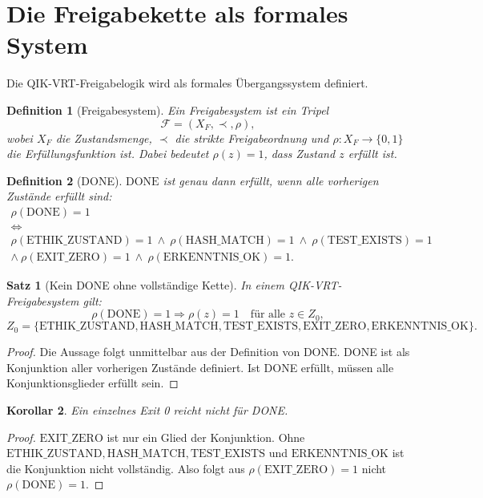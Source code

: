 \documentclass[11pt,a4paper,oneside]{scrartcl}
\theoremstyle{qikstyle}
\newtheorem{definition}{Definition}[section]
\newtheorem{satz}{Satz}[section]
\newtheorem{korollar}[satz]{Korollar}
\newcommand{\DONE}{\mathrm{DONE}}
\newcommand{\HASH}{\mathrm{HASH\_MATCH}}
\newcommand{\TEST}{\mathrm{TEST\_EXISTS}}
\newcommand{\EXIT}{\mathrm{EXIT\_ZERO}}
\newcommand{\ERK}{\mathrm{ERKENNTNIS\_OK}}
\newcommand{\ETH}{\mathrm{ETHIK\_ZUSTAND}}
\newcommand{\F}{\mathcal{F}}
\begin{document}
\section{Die Freigabekette als formales System}

Die QIK-VRT-Freigabelogik wird als formales Übergangssystem definiert.

\begin{definition}[Freigabesystem]
Ein Freigabesystem ist ein Tripel
\[
\F = (X_F,\prec,\rho),
\]
wobei \(X_F\) die Zustandsmenge, \(\prec\) die strikte Freigabeordnung und \(\rho : X_F \to \{0,1\}\) die Erfüllungsfunktion ist. Dabei bedeutet \(\rho(z)=1\), dass Zustand \(z\) erfüllt ist.
\end{definition}

\begin{definition}[DONE]
\(\DONE\) ist genau dann erfüllt, wenn alle vorherigen Zustände erfüllt sind:
\[
\begin{gathered}
\rho(\DONE)=1\\
\Longleftrightarrow\\
\rho(\ETH)=1\ \wedge\ \rho(\HASH)=1\ \wedge\ \rho(\TEST)=1\\
\wedge\ \rho(\EXIT)=1\ \wedge\ \rho(\ERK)=1.
\end{gathered}
\]
\end{definition}

\begin{satz}[Kein DONE ohne vollständige Kette]
In einem QIK-VRT-Freigabesystem gilt:
\[
\rho(\DONE)=1 \Rightarrow \rho(z)=1
\quad \text{für alle } z\in Z_0,
\]
\[
Z_0=\{\ETH,\HASH,\TEST,\EXIT,\ERK\}.
\]
\end{satz}

\begin{proof}
Die Aussage folgt unmittelbar aus der Definition von \(\DONE\). DONE ist als Konjunktion aller vorherigen Zustände definiert. Ist DONE erfüllt, müssen alle Konjunktionsglieder erfüllt sein.
\end{proof}

\begin{korollar}
Ein einzelnes Exit 0 reicht nicht für DONE.
\end{korollar}

\begin{proof}
\(\EXIT\) ist nur ein Glied der Konjunktion. Ohne \(\ETH,\HASH,\TEST\) und \(\ERK\) ist die Konjunktion nicht vollständig. Also folgt aus \(\rho(\EXIT)=1\) nicht \(\rho(\DONE)=1\).
\end{proof}
\newpage
\end{document}
